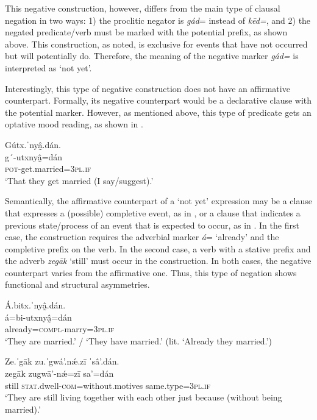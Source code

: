 \documentclass[output=paper,colorlinks=true, citecolor=brown]{langscibook}
\begin{document}
This negative construction, however, differs from the main type of clausal negation in two ways: 1) the proclitic negator is \textit{gád}= instead of \textit{kēd=}, and 2) the negated predicate/verb must be marked with the potential prefix, as shown above. This construction, as noted, is exclusive for events that have not occurred but will potentially do. Therefore, the meaning of the negative marker \textit{gád=} is interpreted as ‘not yet’. 

Interestingly, this type of negative construction does not have an affirmative counterpart. Formally, its negative counterpart would be a declarative clause with the potential marker. However, as mentioned above, this type of predicate gets an optative mood reading, as shown in . 

\ea\label{ex:zap:20} 
    \glll Gútx.ˈnyâ̰.dán.\\ 
          g´-utxnyâ̰=dán\\
          \textsc{pot}{}-get.married=\textsc{3pl.if}\\
    \glt ‘That they get married (I say/suggest).’
\z  

Semantically, the affirmative counterpart of a ‘not yet’ expression may be a clause that expresses a (possible) completive event, as in , or a clause that indicates a previous state/process of an event that is expected to occur, as in . In the first case, the construction requires the adverbial marker \textit{á}= ‘already’ and the completive prefix on the verb. In the second case, a verb with a stative prefix and the adverb \textit{zegāk} ‘still’ must occur in the construction. In both cases, the negative counterpart varies from the affirmative one. Thus, this type of negation shows functional and structural asymmetries. 

\ea\label{ex:zap:21} 
    \glll Á.bitx.ˈnyâ̰.dán. \\ 
          á=bi-utxnyâ̰=dán \\
          already=\textsc{compl}{}-marry=\textsc{3pl.if}\\
    \glt ‘They are married.’ / ‘They have married.’ (lit. ‘Already they married.’)
\z  

\ea\label{ex:zap:22} 
    \glll Ze.ˈgāk zu.ˈgwá’.nǽ.zī ˈsâ’.dán.\\ 
           zegāk zugwā'-nǽ=zī sa'=dán\\
          still \textsc{stat}.dwell-\textsc{com}=without.motives same.type=\textsc{3pl}.\textsc{if}\\
    \glt  ‘They are still living together with each other just because (without being married).’
\z 
\end{document}

